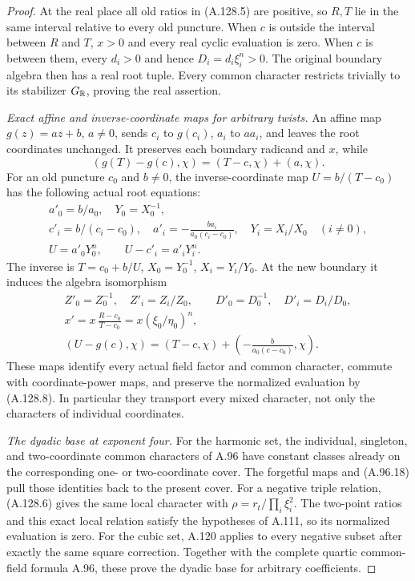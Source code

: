 \begin{proof}
At the real place all old ratios in (A.128.5) are
positive, so $R,T$ lie in the same interval relative
to every old puncture.
When $c$ is outside the interval between $R$ and $T$,
$x>0$ and every real cyclic evaluation is zero.
When $c$ is between them, every $d_i>0$ and hence
$D_i=d_i\xi_i^n>0$.
The original boundary algebra then has a real root tuple.
Every common character restricts trivially to its
stabilizer $G_\mathbb R$, proving the real assertion.

\emph{Exact affine and inverse-coordinate maps for arbitrary twists.}
An affine map $g(z)=az+b$, $a\ne0$, sends
$c_i$ to $g(c_i)$, $a_i$ to $aa_i$, and leaves
the root coordinates unchanged.
It preserves each boundary radicand and $x$, while
\[
                      (g(T)-g(c),\chi)=(T-c,\chi)+(a,\chi).
\tag{A.128.16}
\]
For an old puncture $c_0$ and $b\ne0$, the inverse-coordinate
map $U=b/(T-c_0)$ has the following actual root equations:
\[
 \begin{gathered}
 a'_0=b/a_0,\quad Y_0=X_0^{-1},\\
 c'_i=b/(c_i-c_0),\quad
 a'_i=-\frac{ba_i}{a_0(c_i-c_0)},\quad
 Y_i=X_i/X_0\quad(i\ne0),\\
 U=a'_0Y_0^n,\qquad U-c'_i=a'_iY_i^n.
 \end{gathered}
\tag{A.128.17}
\]
The inverse is $T=c_0+b/U$, $X_0=Y_0^{-1}$,
$X_i=Y_i/Y_0$.
At the new boundary it induces the algebra isomorphism
\[
 \begin{gathered}
 Z'_0=Z_0^{-1},\quad Z'_i=Z_i/Z_0,\qquad
 D'_0=D_0^{-1},\quad D'_i=D_i/D_0,\\
 x'=x\,\frac{R-c_0}{T-c_0}
        =x(\xi_0/\eta_0)^n,\\
 (U-g(c),\chi)=(T-c,\chi)+
                     \left(-\frac b{a_0(c-c_0)},\chi\right).
 \end{gathered}
\tag{A.128.18}
\]
These maps identify every actual field factor and common
character, commute with coordinate-power maps, and preserve
the normalized evaluation by (A.128.8).
In particular they transport every mixed character, not
only the characters of individual coordinates.

\emph{The dyadic base at exponent four.}
For the harmonic set, the individual, singleton, and
two-coordinate common characters of A.96 have constant
classes already on the corresponding one- or two-coordinate
cover.  The forgetful maps and (A.96.18) pull those
identities back to the present cover.
For a negative triple relation, (A.128.6) gives the
same local character with $\rho=r_t/\prod_i\xi_i^2$.
The two-point ratios and this exact local relation satisfy
the hypotheses of A.111, so its normalized evaluation
is zero.
For the cubic set, A.120 applies to every negative subset
after exactly the same square correction.
Together with the complete quartic common-field formula
A.96, these prove the dyadic base for arbitrary coefficients.


\end{proof}
